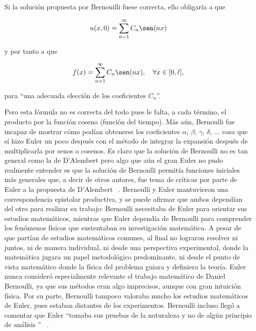 Si la solución propuesta por Bernouilli fuese correcta, ello obligaría a que

\begin{equation}\label{eq10}
	u(x, 0) = \sum_{n=1}^{\infty} C_n \sen(nx)
\end{equation}

y por tanto a que

\begin{equation}\label{eq11}
f(x) = \sum_{n=1}^{\infty} C_n \sen(nx), \quad \forall x \in [0, \ell],
\end{equation}

para “una adecuada elección de los coeficientes \( C_n \)”. \newline


Pero esta fórmula no es correcta del todo pues le falta, a cada término, el producto por la función coseno (función del tiempo). Más aún, Bernoulli fue incapaz de mostrar cómo podían obtenerse los coeficientes \( \alpha \), \( \beta \), \( \gamma \), \( \delta \), ... cosa que sí hizo Euler un poco después con el método de integrar la expansión después de multiplicarla por senos o cosenos. Es claro que la solución de Bernoulli no es tan general como la de D’Alembert pero algo que aún el gran Euler no pudo realmente entender es que la solución de Bernoulli permitía funciones iniciales más generales que, a decir de otros autores, fue tema de críticas por parte de Euler a la propuesta de D’Alembert ~\cite{springer1999Physics}.
Bernoulli y Euler mantuvieron una correspondencia epistolar productiva, y se puede afirmar que ambos dependían del otro para realizar su trabajo: Bernoulli necesitaba de Euler para orientar sus estudios matemáticos, mientras que Euler dependía de Bernoulli para comprender los fenómenos físicos que sustentaban su investigación matemática. A pesar de que partían de estudios matemáticos comunes, al final no lograron resolver ni juntos, ni de manera individual, ni desde una perspectiva experimental, donde la matemática jugara un papel metodológico predominante, ni desde el punto de vista matemático donde la física del problema guiara y definiera la teoría. Euler nunca consideró especialmente relevante el trabajo matemático de Daniel Bernoulli, ya que sus métodos eran algo imprecisos, aunque con gran intuición física. Por su parte, Bernoulli tampoco valoraba mucho los estudios matemáticos de Euler, pues estaban distantes de los experimentos. Bernoulli incluso llegó a comentar que Euler ``tomaba sus pruebas de la naturaleza y no de algún principio de análisis '' ~\cite{springer1999Physics}.


